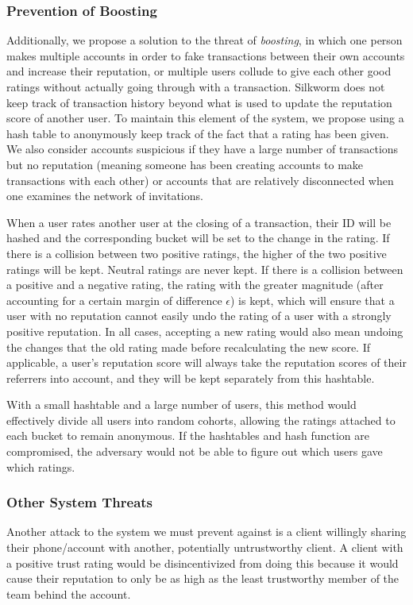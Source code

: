 \documentclass[letterpaper,twocolumn,10pt]{article}
\begin{document}
\subsubsection{Prevention of Boosting}
Additionally, we propose a solution to the threat of \textit{boosting}, in which one person makes multiple accounts in order to fake transactions between their own accounts and increase their reputation, or multiple users collude to give each other good ratings without actually going through with a transaction. Silkworm does not keep track of transaction history beyond what is used to update the reputation score of another user. To maintain this element of the system, we propose using a hash table to anonymously keep track of the fact that a rating has been given. We also consider accounts suspicious if they have a large number of transactions but no reputation (meaning someone has been creating accounts to make transactions with each other) or accounts that are relatively disconnected when one examines the network of invitations. 

When a user rates another user at the closing of a transaction, their ID will be hashed and the corresponding bucket will be set to the change in the rating. If there is a collision between two positive ratings, the higher of the two positive ratings will be kept. Neutral ratings are never kept. If there is a collision between a positive and a negative rating, the rating with the greater magnitude (after accounting for a certain margin of difference $\epsilon$) is kept, which will ensure that a user with no reputation cannot easily undo the rating of a user with a strongly positive reputation. In all cases, accepting a new rating would also mean undoing the changes that the old rating made before recalculating the new score. If applicable, a user's reputation score will always take the reputation scores of their referrers into account, and they will be kept separately from this hashtable.

With a small hashtable and a large number of users, this method would effectively divide all users into random cohorts, allowing the ratings attached to each bucket to remain anonymous. If the hashtables and hash function are compromised, the adversary would not be able to figure out which users gave which ratings.

\subsubsection{Other System Threats}
Another attack to the system we must prevent against is a client willingly sharing their phone/account with another, potentially untrustworthy client. A client with a positive trust rating would be disincentivized from doing this because it would cause their reputation to only be as high as the least trustworthy member of the team behind the account. 
\end{document}
